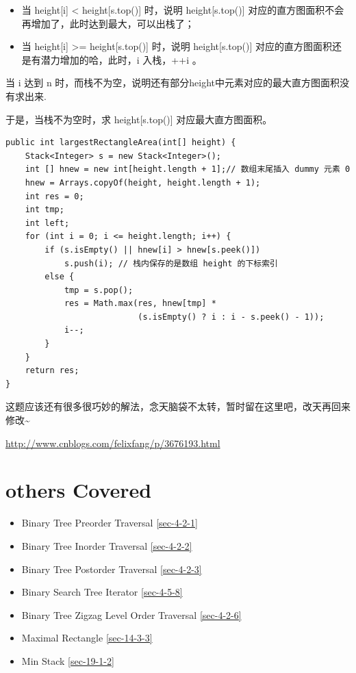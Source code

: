 \documentclass[12pt]{book}
\begin{document}
\begin{enumerate}
\begin{itemize}
\item 当 height[i] < height[s.top()] 时，说明 height[s.top()] 对应的直方图面积不会再增加了，此时达到最大，可以出栈了；

\item 当 height[i] >= height[s.top()] 时，说明 height[s.top()] 对应的直方图面积还是有潜力增加的哈，此时，i 入栈，++i 。
\end{itemize}

当 i 达到 n 时，而栈不为空，说明还有部分height中元素对应的最大直方图面积没有求出来.

于是，当栈不为空时，求 height[s.top()] 对应最大直方图面积。

\lstset{language=java,label= ,caption= ,numbers=none}
\begin{lstlisting}
public int largestRectangleArea(int[] height) {
    Stack<Integer> s = new Stack<Integer>();
    int [] hnew = new int[height.length + 1];// 数组末尾插入 dummy 元素 0
    hnew = Arrays.copyOf(height, height.length + 1);
    int res = 0; 
    int tmp;     
    int left;
    for (int i = 0; i <= height.length; i++) {
        if (s.isEmpty() || hnew[i] > hnew[s.peek()])
            s.push(i); // 栈内保存的是数组 height 的下标索引
        else {
            tmp = s.pop();
            res = Math.max(res, hnew[tmp] * 
                           (s.isEmpty() ? i : i - s.peek() - 1));
            i--;
        }
    }
    return res;
}
\end{lstlisting}

这题应该还有很多很巧妙的解法，念天脑袋不太转，暂时留在这里吧，改天再回来修改\textasciitilde{}~

\url{http://www.cnblogs.com/felixfang/p/3676193.html}
\end{enumerate}

\section{others Covered}
\label{sec-5-4}
\begin{itemize}
\item Binary Tree Preorder Traversal
\ref{sec-4-2-1}
\item Binary Tree Inorder Traversal
\ref{sec-4-2-2}
\item Binary Tree Postorder Traversal
\ref{sec-4-2-3}
\item Binary Search Tree Iterator        
\ref{sec-4-5-8}
\item Binary Tree Zigzag Level Order Traversal
\ref{sec-4-2-6}
\item Maximal Rectangle
\ref{sec-14-3-3}
\item Min Stack
\ref{sec-19-1-2}
\end{itemize}
\end{document}
